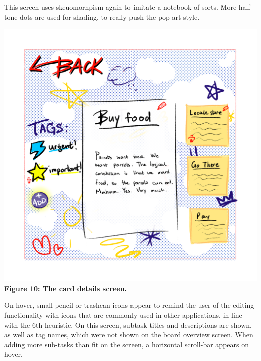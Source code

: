 This screen uses skeuomorhpism again to imitate a notebook of sorts. More half-tone dots are used for shading, to really push the pop-art style.

\includegraphics[scale=0.8]{mocks/hue_mock_card_details.png}
\textbf{Figure 10: The card details screen.}
\newline

On hover, small pencil or trashcan icons appear to remind the user of the editing functionality with icons that are commonly used in other applications, in line with the 6th heuristic. On this screen, subtask titles and descriptions are shown, as well as tag names, which were not shown on the board overview screen. When adding more sub-tasks than fit on the screen, a horizontal scroll-bar appears on hover.